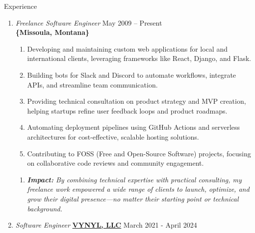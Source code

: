 \documentclass[oneside]{article}%
\begin{document}
 
\onecolumn


\renewcommand{\footrulewidth}{1pt}


\noindent
\huge{Experience}
\small
\begin{enumerate}[]
	\item \textit{Freelance Software Engineer} \hfill May 2009 -- Present\\
		\textbf{\{Missoula, Montana\}}
		\begin{enumerate}[-]
		    \item Developing and maintaining custom web applications for local and international clients, 
		          leveraging frameworks like React, Django, and Flask.
		    \item Building bots for Slack and Discord to automate workflows, integrate APIs, 
		          and streamline team communication.
		    \item Providing technical consultation on product strategy and MVP creation, helping 
		          startups refine user feedback loops and product roadmaps.
		    \item Automating deployment pipelines using GitHub Actions and serverless architectures 
		          for cost-effective, scalable hosting solutions.
		    \item Contributing to FOSS (Free and Open-Source Software) projects, focusing on 
		          collaborative code reviews and community engagement.
		\end{enumerate}
		\begin{enumerate}[]
			\item \textit{\textbf{Impact:} By combining technical expertise with practical consulting, my freelance work empowered a wide range of clients to launch, optimize, and grow their digital presence—no matter their starting point or technical background.}
		\end{enumerate}
	\item \textit{Software Engineer} \textbf{\href{https://vynyl.com}{VYNYL, LLC}} \hfill March 2021 - April 2024\\

\end{enumerate}
\end{document}
